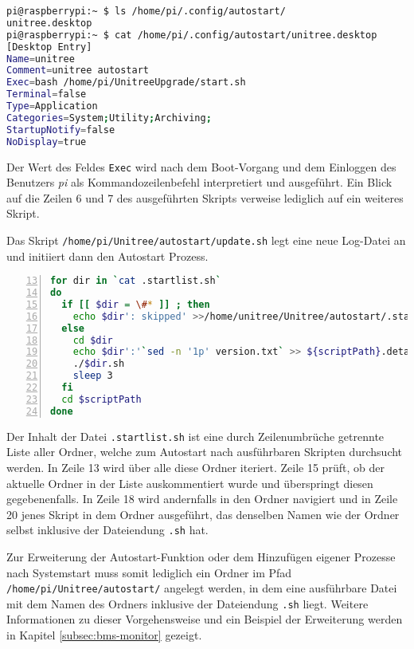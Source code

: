 \begin{lstlisting}[language=sh]
pi@raspberrypi:~ $ ls /home/pi/.config/autostart/
unitree.desktop
pi@raspberrypi:~ $ cat /home/pi/.config/autostart/unitree.desktop
[Desktop Entry]
Name=unitree
Comment=unitree autostart
Exec=bash /home/pi/UnitreeUpgrade/start.sh
Terminal=false
Type=Application
Categories=System;Utility;Archiving;
StartupNotify=false
NoDisplay=true
\end{lstlisting}

\noindent Der Wert des Feldes \texttt{Exec} wird nach dem Boot-Vorgang und dem Einloggen des Benutzers \emph{pi} als
Kommandozeilenbefehl interpretiert und ausgeführt.
Ein Blick auf die Zeilen \num{6} und \num{7} des ausgeführten Skripts verweise lediglich auf ein weiteres Skript.



\noindent Das Skript \texttt{/home/\allowbreak pi/\allowbreak Unitree/\allowbreak autostart/\allowbreak update.sh}
legt eine neue Log-Datei an und initiiert dann den Autostart Prozess.

\begin{lstlisting}[language=Bash,numbers=left,xleftmargin=\dimexpr2.5em-1pt,framexleftmargin=2em,firstnumber=13]
for dir in `cat .startlist.sh`
do
  if [[ $dir = \#* ]] ; then
    echo $dir': skipped' >>/home/unitree/Unitree/autostart/.startlog
  else
    cd $dir
    echo $dir':'`sed -n '1p' version.txt` >> ${scriptPath}.detailedVersion
    ./$dir.sh
    sleep 3
  fi
  cd $scriptPath
done
\end{lstlisting}

\noindent Der Inhalt der Datei \texttt{.startlist.sh} ist eine durch Zeilenumbrüche getrennte Liste aller Ordner, welche
zum Autostart nach ausführbaren Skripten durchsucht werden.
In Zeile \num{13} wird über alle diese Ordner iteriert.
Zeile \num{15} prüft, ob der aktuelle Ordner in der Liste auskommentiert wurde und überspringt diesen gegebenenfalls.
In Zeile \num{18} wird andernfalls in den Ordner navigiert und in Zeile \num{20} jenes Skript in dem Ordner ausgeführt,
das denselben Namen wie der Ordner selbst inklusive der Dateiendung \texttt{.sh} hat.

Zur Erweiterung der Autostart-Funktion oder dem Hinzufügen eigener Prozesse nach Systemstart muss somit lediglich ein
Ordner im Pfad \texttt{/home/\allowbreak pi/\allowbreak Unitree/\allowbreak auto\-start/} angelegt werden, in dem eine
ausführbare Datei mit dem Namen des Ordners inklusive der Dateiendung \texttt{.sh} liegt.
Weitere Informationen zu dieser Vorgehensweise und ein Beispiel der Erweiterung werden in Kapitel \ref{subsec:bms-monitor}
gezeigt.
